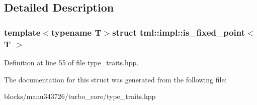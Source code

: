\subsection{Detailed Description}
\subsubsection*{template$<$typename T$>$struct tml\+::impl\+::is\+\_\+fixed\+\_\+point$<$ T $>$}



Definition at line 55 of file type\+\_\+traits.\+hpp.



The documentation for this struct was generated from the following file\+:\begin{DoxyCompactItemize}
\item 
blocks/manu343726/turbo\+\_\+core/type\+\_\+traits.\+hpp\end{DoxyCompactItemize}
